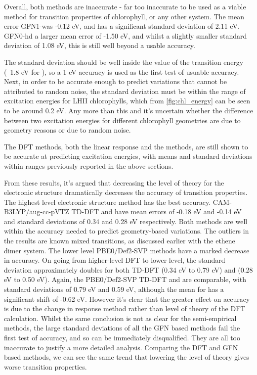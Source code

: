 Overall, both \dxtb methods are inaccurate - far too inaccurate to be used as a 
viable method for transition properties of chlorophyll, or any other system.
The mean error GFN1-\dxtb was -0.12 eV, and has a significant standard deviation
of 2.11 eV. GFN0-\dxtb hd a larger mean error of -1.50 eV, and whilst a slightly
smaller standard deviation of 1.08 eV, this is still well beyond a usable accuracy.

The standard deviation should be well inside the value of the transition energy
(~1.8 eV for \Qy), so a 1 eV accuracy is used as the first test of usuable accuracy.
Next, in order to be accurate enough to predict variations that cannot be attributed
to random noise, the standard deviation must be within the range of excitation energies 
for LHII chlorophylls, which from \ref{fig:chl_energy} can be seen to be around 0.2 eV.
Any more than this and it's uncertain whether the difference between two excitation 
energies for different chlorophyll geometries are due to geometry reasons or due
to random noise.

The DFT methods, both the linear response and the \dscf methods, are still shown
to be accurate at predicting excitation energies, with means and standard deviations
within ranges previously reported in the above sections.

From these results, it's argued that decreasing the level of theory for the electronic
structure dramatically decreases the accuracy of transition properties.
The highest level electronic structure method has the best accuracy. CAM-B3LYP/aug-cc-pVTZ 
TD-DFT and \dscf have mean errors of -0.18 eV and -0.14 eV and standard
deviations of 0.34 and 0.28 eV respectively. Both methods are well within the accuracy
needed to predict geometry-based variations. The outliers in the \dscf results are known 
mixed transitions, as discussed earlier with the ethene dimer system. 
The lower level PBE0/Def2-SVP methods have a marked decrease in accuracy. On going
from higher-level DFT to lower level, the standard deviation approximately doubles 
for both TD-DFT (0.34 eV to 0.79 eV) and \dscf (0.28 eV to 0.50 eV). Again, the
PBE0/Def2-SVP TD-DFT and \dscf are comparable, with standard deviations of 0.79 eV
and 0.59 eV, although the mean for \dscf has a significant shift of -0.62 eV. 
However it's clear that the greater effect on accuracy is due to the change in
response method rather than level of theory of the DFT calculation.
Whilst the same conclusion is not as clear for the semi-empirical methods, the 
large standard deviations of all the GFN based methods fail the first test of
accuracy, and so can be immediately disqualified. They are all too inaccurate to 
justify a more detailed analysis.
Comparing the DFT and GFN based methods, we can see the same trend that lowering
the level of theory gives worse transition properties.

